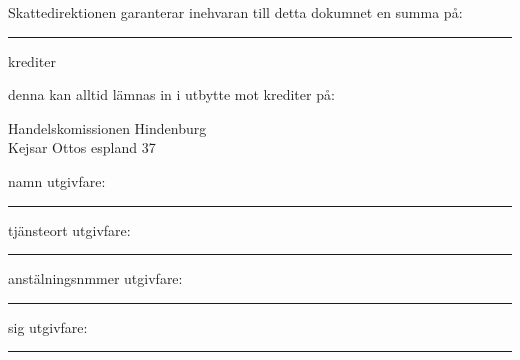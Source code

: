 \documentclass{letter}
\begin{document}
Skattedirektionen garanterar inehvaran till detta dokumnet en summa på:\\

\vspace*{1cm}
\hrule

\small krediter \\ 
\normalsize
\vspace*{1cm}


denna kan alltid lämnas in i utbytte mot krediter på:\\
\vspace*{0.2cm}

\large
\hspace*{1cm} Handelskomissionen Hindenburg \\
\hspace*{1cm} Kejsar Ottos espland 37\\


\normalsize

\vfill
namn utgivfare:
\vspace*{1cm}
\hrule
tjänsteort utgivfare:
\vspace*{1cm}
\hrule
anstälningsnmmer utgivfare:
\vspace*{1cm}
\hrule
sig utgivfare:
\vspace*{1cm}
\hrule
\end{document}
